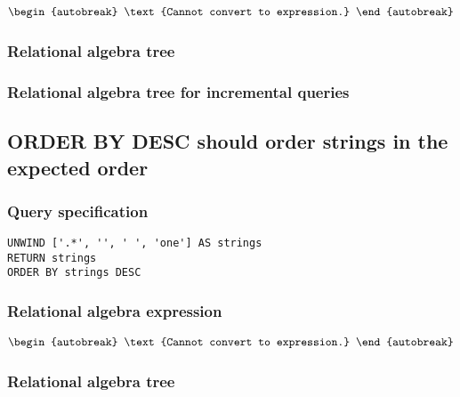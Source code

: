 \begin{align*}
\begin{autobreak}
\text{Cannot convert to expression.}
\end{autobreak}
\end{align*}

\subsubsection*{Relational algebra tree}


\subsubsection*{Relational algebra tree for incremental queries}


\subsection{ORDER BY DESC should order strings in the expected order}

\subsubsection*{Query specification}

\begin{lstlisting}
UNWIND ['.*', '', ' ', 'one'] AS strings
RETURN strings
ORDER BY strings DESC
\end{lstlisting}

\subsubsection*{Relational algebra expression}

\begin{align*}
\begin{autobreak}
\text{Cannot convert to expression.}
\end{autobreak}
\end{align*}

\subsubsection*{Relational algebra tree}


